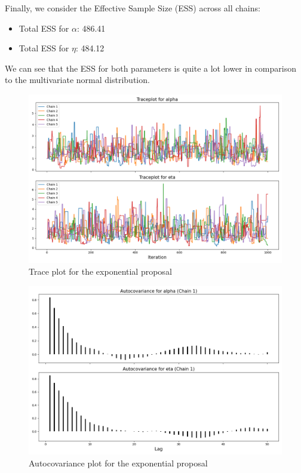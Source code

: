 \documentclass[9pt]{IEEEtran}
\begin{document}
Finally, we consider the Effective Sample Size (ESS) across all chains:
\begin{itemize}
    \item Total ESS for $\alpha$: 486.41
    \item Total ESS for $\eta$: 484.12
\end{itemize}

We can see that the ESS for both parameters is quite a lot lower in comparison to the multivariate 
normal distribution. 


    \begin{figure}[h]
        \centering
        \includegraphics[width=0.99\columnwidth]{figures/exp_trace.png}
        \caption{Trace plot for the exponential proposal}
        \label{fig:exp_trace}
    \end{figure}


        \begin{figure}[h]
        \centering
        \includegraphics[width=0.99\columnwidth]{figures/exp_cov.png}
        \caption{Autocovariance plot for the exponential proposal}
        \label{fig:exp_cov}
    \end{figure}
\end{document}
